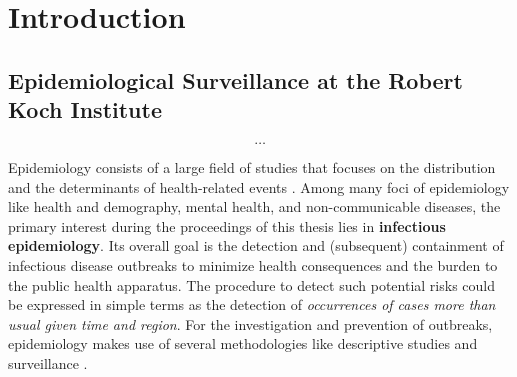 \chapter{Introduction}

\section{Epidemiological Surveillance at the Robert Koch Institute}
  \[\dots\]

  Epidemiology consists of a large field of studies that focuses on the distribution and the determinants of health-related events \citep{WHOepi}.
  Among many foci of epidemiology like health and demography, mental health, and non-communicable diseases, the primary interest during the proceedings of this thesis lies in \textbf{infectious epidemiology}.
  Its overall goal is the detection and (subsequent) containment of infectious disease outbreaks to minimize health consequences and the burden to the public health apparatus.
  The procedure to detect such potential risks could be expressed in simple terms as the detection of \textit{occurrences of cases more than usual given time and region}.
  For the investigation and prevention of outbreaks, epidemiology makes use of several methodologies like descriptive studies and surveillance \citep{WHOepi}.

